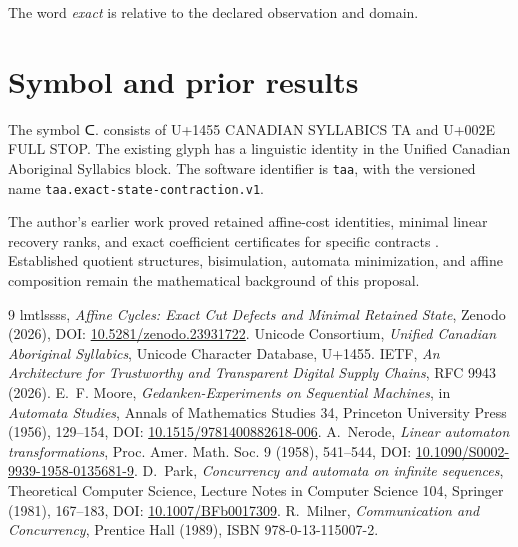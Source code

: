 \documentclass[11pt,a4paper]{article}
\begin{document}
The word \emph{exact} is relative to the declared observation and domain.

\section{Symbol and prior results}
The symbol {\taafont ᑕ.} consists of U+1455 CANADIAN SYLLABICS TA and
U+002E FULL STOP. The existing glyph has a linguistic identity in the
Unified Canadian Aboriginal Syllabics block.
The software identifier is \texttt{taa}, with the versioned name
\texttt{taa.exact-state-contraction.v1}.

The author's earlier work proved retained affine-cost identities,
minimal linear recovery ranks, and exact coefficient certificates for
specific contracts \cite{affine}. Established quotient structures,
bisimulation, automata minimization, and affine composition remain
the mathematical background of this proposal.

\begin{thebibliography}{9}
 lmtlssss, \emph{Affine Cycles: Exact Cut Defects and Minimal
Retained State}, Zenodo (2026), DOI: \href{https://doi.org/10.5281/zenodo.23931722}{10.5281/zenodo.23931722}.
 Unicode Consortium, \emph{Unified Canadian Aboriginal Syllabics}, Unicode Character Database, U+1455.
 IETF, \emph{An Architecture for Trustworthy and Transparent Digital Supply Chains}, RFC 9943 (2026).
 E.~F. Moore, \emph{Gedanken-Experiments on Sequential Machines}, in \emph{Automata Studies}, Annals of Mathematics Studies 34, Princeton University Press (1956), 129--154, DOI: \href{https://doi.org/10.1515/9781400882618-006}{10.1515/9781400882618-006}.
 A.~Nerode, \emph{Linear automaton transformations}, Proc. Amer. Math. Soc. 9 (1958), 541--544, DOI: \href{https://doi.org/10.1090/S0002-9939-1958-0135681-9}{10.1090/S0002-9939-1958-0135681-9}.
 D.~Park, \emph{Concurrency and automata on infinite sequences}, Theoretical Computer Science, Lecture Notes in Computer Science 104, Springer (1981), 167--183, DOI: \href{https://doi.org/10.1007/BFb0017309}{10.1007/BFb0017309}.
 R.~Milner, \emph{Communication and Concurrency}, Prentice Hall (1989), ISBN 978-0-13-115007-2.
\end{thebibliography}
\end{document}
